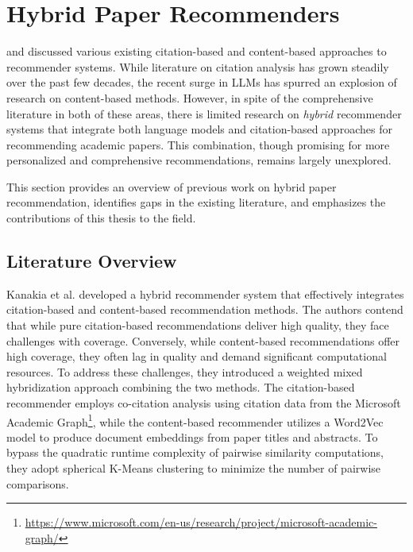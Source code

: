 \section{Hybrid Paper Recommenders} \label{sec:hybrid-recommenders-for-academic-papers}

 and  discussed various existing citation-based and content-based approaches to recommender systems. While literature on citation analysis has grown steadily over the past few decades, the recent surge in \ac{LLMs} has spurred an explosion of research on content-based methods.
However, in spite of the comprehensive literature in both of these areas, there is limited research on \emph{hybrid} recommender systems that integrate both language models and citation-based approaches for recommending academic papers. This combination, though promising for more personalized and comprehensive recommendations, remains largely unexplored.

This section provides an overview of previous work on hybrid paper recommendation, identifies gaps in the existing literature, and emphasizes the contributions of this thesis to the field.


\subsection{Literature Overview}

Kanakia et al. \cite{KanakiaScalableHybrid2019} developed a hybrid recommender system that effectively integrates citation-based and content-based recommendation methods.
The authors contend that while pure citation-based recommendations deliver high quality, they face challenges with coverage.
Conversely, while content-based recommendations offer high coverage, they often lag in quality and demand significant computational resources.
To address these challenges, they introduced a weighted mixed hybridization approach combining the two methods.
The citation-based recommender employs co-citation analysis using citation data from the Microsoft Academic Graph\footnote{\url{https://www.microsoft.com/en-us/research/project/microsoft-academic-graph/}}, while the content-based recommender utilizes a Word2Vec model \cite{MikolovEfficientEstimation2013} to produce document embeddings from paper titles and abstracts.
To bypass the quadratic runtime complexity of pairwise similarity computations, they adopt spherical K-Means clustering to minimize the number of pairwise comparisons.

